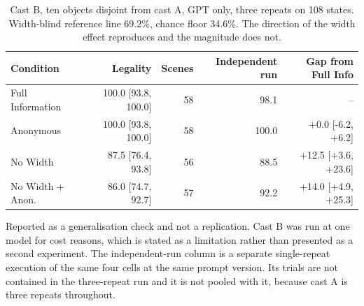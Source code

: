 \begin{table}[H]
  \centering
  \caption{Cast B, ten objects disjoint from cast A, GPT only, three repeats on 108 states. Width-blind reference line 69.2\%, chance floor 34.6\%. The direction of the width effect reproduces and the magnitude does not.}
  \label{tab:ex1:castb}
  \small
  \begin{tabular}{lrrrr}
    \toprule
    Condition & Legality & Scenes & Independent run & Gap from Full Info \\
    \midrule
    Full Information & 100.0 [93.8, 100.0] & 58 & 98.1 & -- \\
    Anonymous & 100.0 [93.8, 100.0] & 58 & 100.0 & +0.0 [-6.2, +6.2] \\
    No Width & 87.5 [76.4, 93.8] & 56 & 88.5 & +12.5 [+3.6, +23.6] \\
    No Width + Anon. & 86.0 [74.7, 92.7] & 57 & 92.2 & +14.0 [+4.9, +25.3] \\
    \bottomrule
  \end{tabular}
  \begin{minipage}{\linewidth}\vspace{2pt}\footnotesize Reported as a generalisation check and not a replication. Cast B was run at one model for cost reasons, which is stated as a limitation rather than presented as a second experiment. The independent-run column is a separate single-repeat execution of the same four cells at the same prompt version. Its trials are not contained in the three-repeat run and it is not pooled with it, because cast A is three repeats throughout.\end{minipage}
\end{table}
